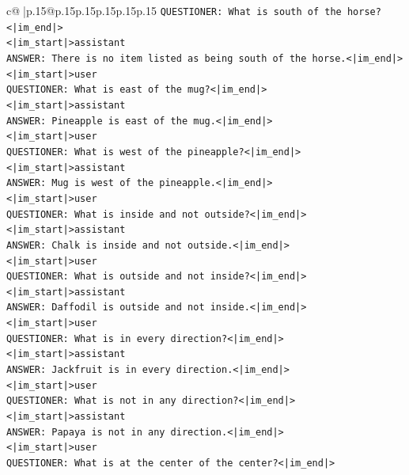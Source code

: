 \documentclass{article}
\begin{document}
{\begin{supertabular}{c@{$\;$}|p{.15\linewidth}@{}p{.15\linewidth}p{.15\linewidth}p{.15\linewidth}p{.15\linewidth}p{.15\linewidth}}
{{{\texttt{QUESTIONER: What is south of the horse?<|im\_end|>} \\
\texttt{<|im\_start|>assistant} \\
\texttt{ANSWER: There is no item listed as being south of the horse.<|im\_end|>} \\
\texttt{<|im\_start|>user} \\
\texttt{QUESTIONER: What is east of the mug?<|im\_end|>} \\
\texttt{<|im\_start|>assistant} \\
\texttt{ANSWER: Pineapple is east of the mug.<|im\_end|>} \\
\texttt{<|im\_start|>user} \\
\texttt{QUESTIONER: What is west of the pineapple?<|im\_end|>} \\
\texttt{<|im\_start|>assistant} \\
\texttt{ANSWER: Mug is west of the pineapple.<|im\_end|>} \\
\texttt{<|im\_start|>user} \\
\texttt{QUESTIONER: What is inside and not outside?<|im\_end|>} \\
\texttt{<|im\_start|>assistant} \\
\texttt{ANSWER: Chalk is inside and not outside.<|im\_end|>} \\
\texttt{<|im\_start|>user} \\
\texttt{QUESTIONER: What is outside and not inside?<|im\_end|>} \\
\texttt{<|im\_start|>assistant} \\
\texttt{ANSWER: Daffodil is outside and not inside.<|im\_end|>} \\
\texttt{<|im\_start|>user} \\
\texttt{QUESTIONER: What is in every direction?<|im\_end|>} \\
\texttt{<|im\_start|>assistant} \\
\texttt{ANSWER: Jackfruit is in every direction.<|im\_end|>} \\
\texttt{<|im\_start|>user} \\
\texttt{QUESTIONER: What is not in any direction?<|im\_end|>} \\
\texttt{<|im\_start|>assistant} \\
\texttt{ANSWER: Papaya is not in any direction.<|im\_end|>} \\
\texttt{<|im\_start|>user} \\
\texttt{QUESTIONER: What is at the center of the center?<|im\_end|>} \\
}}}
\end{supertabular}}
\end{document}
